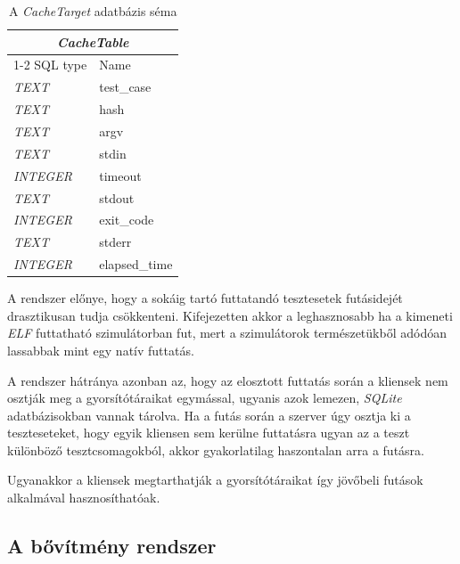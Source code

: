         \begin{table}[ht]
            \centering
            \begin{tabular}{ll}
                \toprule
                \multicolumn{2}{c}{\textit{CacheTable}} \\
                \cmidrule{1-2}
                SQL type         & Name                 \\
                \midrule
                \textit{TEXT}    & test\_case           \\
                \textit{TEXT}    & hash                 \\
                \textit{TEXT}    & argv                 \\
                \textit{TEXT}    & stdin                \\
                \textit{INTEGER} & timeout              \\
                \textit{TEXT}    & stdout               \\
                \textit{INTEGER} & exit\_code           \\
                \textit{TEXT}    & stderr               \\
                \textit{INTEGER} & elapsed\_time        \\
                \bottomrule
            \end{tabular}
            \caption{\label{fig:cache-schema} A \textit{CacheTarget} adatbázis séma}
        \end{table}

        A rendszer előnye, hogy a sokáig tartó futtatandó tesztesetek futásidejét drasztikusan tudja csökkenteni.
        Kifejezetten akkor a leghasznosabb ha a kimeneti \textit{ELF} futtatható szimulátorban fut, mert a szimulátorok
        természetükből adódóan lassabbak mint egy natív futtatás.

        A rendszer hátránya azonban az, hogy az elosztott futtatás során a kliensek nem osztják meg a gyorsítótáraikat
        egymással, ugyanis azok lemezen, \textit{SQLite} adatbázisokban vannak tárolva. Ha a futás során a szerver úgy
        osztja ki a teszteseteket, hogy egyik kliensen sem kerülne futtatásra ugyan az a teszt különböző
        tesztcsomagokból, akkor gyakorlatilag haszontalan arra a futásra.

        Ugyanakkor a kliensek megtarthatják a gyorsítótáraikat így jövőbeli futások alkalmával hasznosíthatóak.

    \subsection{A bővítmény rendszer}

